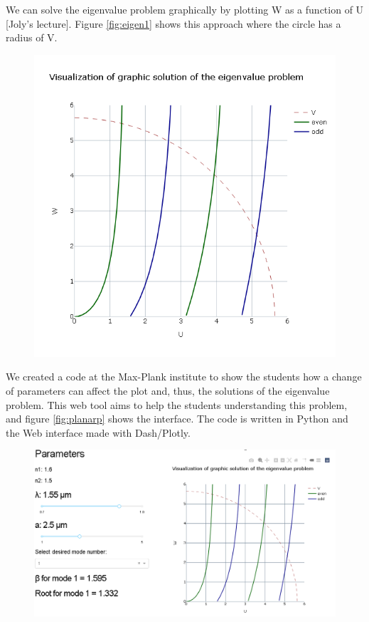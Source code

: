         We can solve the eigenvalue problem graphically by plotting W as a function of U [Joly's lecture]. Figure \ref{fig:eigen1} shows this approach where the circle has a radius of V.
        
        
        \begin{figure}[label={fig:eigen1}, caption={Visualization of the graphic solution of the eigenvalue problem. Taken from \cite{herokuapp}}]
        	\includegraphics[width=.6\textwidth]{figures/chap2/Eigenvalue.png} 
        \end{figure}
        
        We created a code at the Max-Plank institute \cite{gitmax} to show the students how a change of parameters can affect the plot and, thus, the solutions of the eigenvalue problem. This web tool aims to help the students understanding this problem, and figure \ref{fig:planarp}  shows the interface. The code is written in Python and the Web interface made with Dash/Plotly.  
        
        \begin{figure}[label={fig:planarp}, caption={\href{https://fiber-mode-app.herokuapp.com/apps/dash_plot}{Heroku app} for the planar waveguide.}]
        	\includegraphics[width=.8\textwidth]{figures/chap2/planarpage.png} 
        \end{figure}
        
